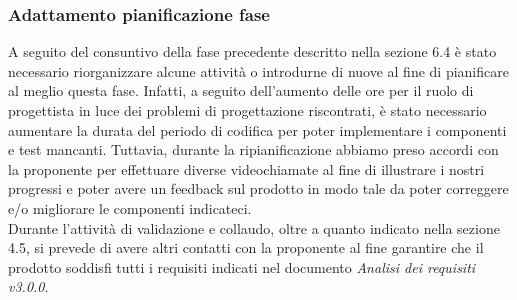 \subsubsection{Adattamento pianificazione fase}
A seguito del consuntivo della fase precedente descritto nella sezione 6.4 è 
stato necessario riorganizzare alcune attività o introdurne di nuove al fine di 
pianificare al meglio questa fase. Infatti, a seguito dell'aumento delle ore per 
il ruolo di progettista in luce dei problemi di progettazione riscontrati, è 
stato necessario aumentare la durata del periodo di codifica per poter 
implementare i componenti e test mancanti. Tuttavia, durante la ripianificazione 
abbiamo preso accordi con la proponente per effettuare diverse videochiamate al 
fine di illustrare i nostri progressi e poter avere un feedback sul prodotto in 
modo tale da poter correggere e/o migliorare le componenti indicateci.\\
Durante l'attività di validazione e collaudo, oltre a quanto indicato nella 
sezione 4.5, si prevede di avere altri contatti con la proponente al fine 
garantire che il prodotto soddisfi tutti i requisiti indicati nel documento 
\textit{Analisi dei requisiti v3.0.0}.
